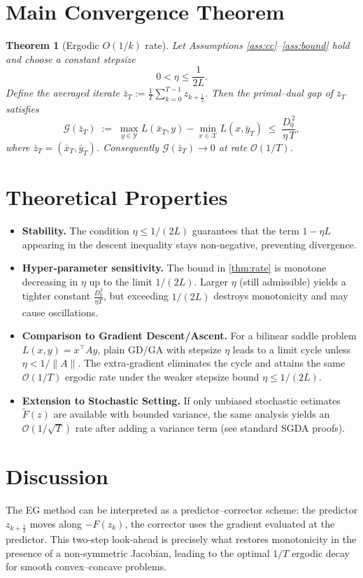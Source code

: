 \documentclass{article}
\newtheorem{theorem}{Theorem}
\newcommand{\gap}{\mathcal{G}}
\begin{document}
\section*{Main Convergence Theorem}
\begin{theorem}[Ergodic $O(1/k)$ rate]\label{thm:rate}
Let Assumptions \ref{ass:cc}–\ref{ass:bound} hold and choose a constant stepsize 
\[
0<\eta\le\frac{1}{2L}.
\]
Define the averaged iterate $\displaystyle \bar z_T:=\frac1T\sum_{k=0}^{T-1}z_{k+\frac12}$.  
Then the primal–dual gap of $\bar z_T$ satisfies
\[
\gap(\bar z_T)\;:=\;
\max_{y\in\mathcal{Y}}L(\bar x_T,y)-\min_{x\in\mathcal{X}}L(x,\bar y_T)
\;\le\;
\frac{D_0^{\,2}}{\eta\,T},
\tag{2}
\]
where $\bar z_T=(\bar x_T,\bar y_T)$. Consequently $\gap(\bar z_T)\to0$ at rate $\mathcal{O}(1/T)$.
\end{theorem}

\section*{Theoretical Properties}
\begin{itemize}
\item \textbf{Stability.} The condition $\eta\le 1/(2L)$ guarantees that the term $1-\eta L$ appearing in the descent inequality stays non‑negative, preventing divergence.
\item \textbf{Hyper‑parameter sensitivity.} The bound in \eqref{thm:rate} is monotone decreasing in $\eta$ up to the limit $1/(2L)$. Larger $\eta$ (still admissible) yields a tighter constant $\frac{D_0^{2}}{\eta T}$, but exceeding $1/(2L)$ destroys monotonicity and may cause oscillations.
\item \textbf{Comparison to Gradient Descent/Ascent.} For a bilinear saddle problem $L(x,y)=x^\top Ay$, plain GD/GA with stepsize $\eta$ leads to a limit cycle unless $\eta<1/\|A\|$. The extra‑gradient eliminates the cycle and attains the same $\mathcal{O}(1/T)$ ergodic rate under the weaker stepsize bound $\eta\le 1/(2L)$.
\item \textbf{Extension to Stochastic Setting.} If only unbiased stochastic estimates $\tilde F(z)$ are available with bounded variance, the same analysis yields an $\mathcal{O}(1/\sqrt{T})$ rate after adding a variance term (see standard SGDA proofs).
\end{itemize}

\section*{Discussion}
The EG method can be interpreted as a predictor–corrector scheme: the predictor $z_{k+\frac12}$ moves along $-F(z_k)$, the corrector uses the gradient evaluated at the predictor. This two‑step look‑ahead is precisely what restores monotonicity in the presence of a non‑symmetric Jacobian, leading to the optimal $1/T$ ergodic decay for smooth convex–concave problems.
\end{document}

